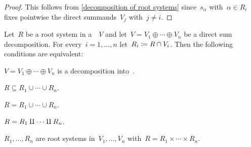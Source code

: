\begin{proof}
  This follows from \cref{decomposition of root systems} since~$s_\alpha$ with~$\alpha \in R_i$ fixes pointwise the direct summands~$V_j$ with~$j \neq i$.
\end{proof}




\begin{lemma}
  \label{characterizations of root system decompositions}
  Let~$R$ be a root system in a~{\vectorspace{$\kf$}}~$V$ and let~$V = V_1 \oplus \dotsb \oplus V_n$ be a direct sum decomposition.
  For every~$i = 1, \dotsc, n$ let~$R_i \coloneqq R \cap V_i$.
  Then the following conditions are equivalent:
  \begin{equivalenceslist}
    \item
      \label{decomposition into subreps}
      $V = V_1 \oplus \dotsb \oplus V_n$ is a decomposition into~{}.
    \item
      \label{contained in union}
      $R \subseteq R_1 \cup \dotsb \cup R_n$.
    \item
      \label{decomposition into subsets}
      $R = R_1 \cup \dotsb \cup R_n$.
    \item
      \label{disjoint decomposition into subsets}
      $R = R_1 \amalg \dotsb \amalg R_n$.
    \item
      \label{decomposition into root systems}
      $R_1, \dotsc, R_n$ are root systems in~$V_1, \dotsc, V_n$ with~$R = R_1 \times \dotsb \times R_n$.
  \end{equivalenceslist}
\end{lemma}


